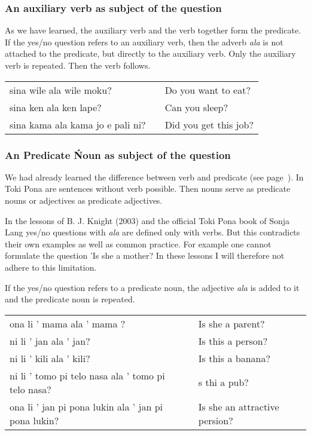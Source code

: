 \subsubsection*{An auxiliary verb as subject of the question}
%
As we have learned, the auxiliary verb and the verb together form the predicate. 
If the yes/no question refers to an auxiliary verb, then the adverb \textit{ala} is not attached to the predicate, but directly to the auxiliary verb.
Only the auxiliary verb is repeated. 
Then the verb follows. 

\begin{supertabular}{p{5,5cm}|ll}
sina wile ala wile moku? && Do you want to eat? \\ 
sina ken ala ken lape? && Can you sleep? \\
sina kama ala kama jo e pali ni? && Did you get this job?
\end{supertabular} 

\subsubsection*{An Predicate Ńoun as subject of the question}
%
We had already learned the difference between verb and predicate (see page~\pageref{'predicate'}). 
In Toki Pona are sentences without verb possible. 
Then nouns serve as predicate nouns or adjectives as predicate adjectives. 

In the lessons of B. J. Knight (2003) and the official Toki Pona book of Sonja Lang \cite{www:tokipona.org} yes/no questions with \textit{ala} are defined only with verbs. 
But this contradicts their own examples as well as common practice. 
For example one cannot formulate the question 'Is she a mother? 
In these lessons I will therefore not adhere to this limitation. 

If the yes/no question refers to a predicate noun, the adjective \textit{ala} is added to it and the predicate noun is repeated.

\begin{supertabular}{p{5,5cm}|ll}
ona li ' mama ala ' mama ? && Is she a parent? \\
ni li ' jan ala ' jan? && Is this a person? \\
ni li ' kili ala ' kili? && Is this a banana? \\
ni li ' tomo pi telo nasa ala ' tomo pi telo nasa? && s thi a pub? \\
ona li ' jan pi pona lukin ala ' jan pi pona lukin? && Is she an attractive persion? \\
\end{supertabular} 

